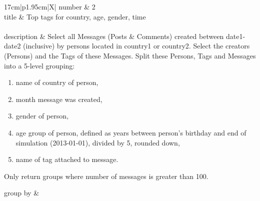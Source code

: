 \renewcommand*{\arraystretch}{1.1}

\noindent\begin{tabularx}{17cm}{|p{1.95cm}|X|}
	\hline
	number      & 2                                                          \\ \hline
%
	title       & Top tags for country, age, gender, time                                                           \\ \hline
	 \\ \hline
	description & Select all Messages (Posts \& Comments) created between date1-date2
(inclusive) by persons located in country1 or country2. Select the
creators (Persons) and the Tags of these Messages. Split these Persons,
Tags and Messages into a 5-level grouping:

\begin{enumerate}
\def\labelenumi{\arabic{enumi}.}
\tightlist
\item
  name of country of person,
\item
  month message was created,
\item
  gender of person,
\item
  age group of person, defined as years between person's birthday and
  end of simulation (2013-01-01), divided by 5, rounded down,
\item
  name of tag attached to message.
\end{enumerate}

Only return groups where number of messages is greater than 100.
 \\ \hline
	
%
	group by       &
	 \\ \hline
	

\end{tabularx}
